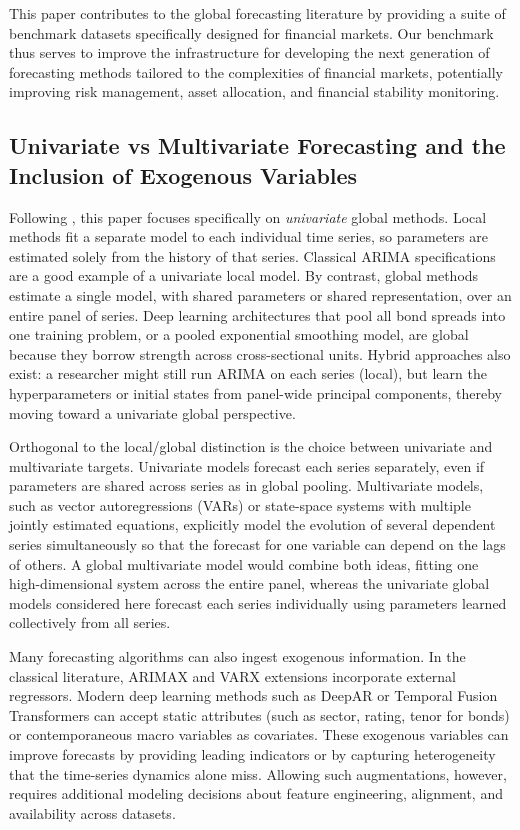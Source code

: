 \documentclass{article}
\begin{document}
This paper contributes to the global forecasting literature by providing a suite of benchmark datasets specifically designed for financial markets. Our benchmark thus serves to improve the infrastructure for developing the next generation of forecasting methods tailored to the complexities of financial markets, potentially improving risk management, asset allocation, and financial stability monitoring.

\subsection{Univariate vs Multivariate Forecasting and the Inclusion of Exogenous Variables}\label{subsec:univariate_multivariate}

Following \citet{Godahewa2021}, this paper focuses specifically on \emph{univariate} global methods. 
Local methods fit a separate model to each individual time series, so parameters are estimated solely from the history of that series. Classical ARIMA specifications are a good example of a univariate local model. By contrast, global methods estimate a single model, with shared parameters or shared representation, over an entire panel of series. Deep learning architectures that pool all bond spreads into one training problem, or a pooled exponential smoothing model, are global because they borrow strength across cross-sectional units. Hybrid approaches also exist: a researcher might still run ARIMA on each series (local), but learn the hyperparameters or initial states from panel-wide principal components, thereby moving toward a univariate global perspective.

Orthogonal to the local/global distinction is the choice between univariate and multivariate targets. Univariate models forecast each series separately, even if parameters are shared across series as in global pooling. Multivariate models, such as vector autoregressions (VARs) or state-space systems with multiple jointly estimated equations, explicitly model the evolution of several dependent series simultaneously so that the forecast for one variable can depend on the lags of others. A global multivariate model would combine both ideas, fitting one high-dimensional system across the entire panel, whereas the univariate global models considered here forecast each series individually using parameters learned collectively from all series.

Many forecasting algorithms can also ingest exogenous information. In the classical literature, ARIMAX and VARX extensions incorporate external regressors. Modern deep learning methods such as DeepAR or Temporal Fusion Transformers can accept static attributes (such as sector, rating, tenor for bonds) or contemporaneous macro variables as covariates. These exogenous variables can improve forecasts by providing leading indicators or by capturing heterogeneity that the time-series dynamics alone miss. Allowing such augmentations, however, requires additional modeling decisions about feature engineering, alignment, and availability across datasets.
\end{document}
